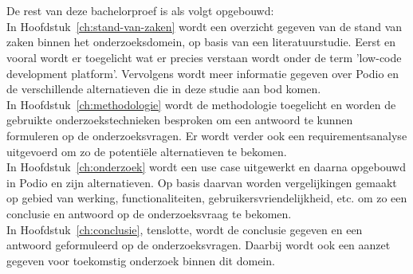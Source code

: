 \section{}%
\label{sec:opzet-bachelorproef} %


De rest van deze bachelorproef is als volgt opgebouwd: \\

In Hoofdstuk~\ref{ch:stand-van-zaken} wordt een overzicht gegeven van de stand van zaken binnen het onderzoeksdomein, op basis van een literatuurstudie. Eerst en vooral wordt er toegelicht wat er precies verstaan wordt onder de term 'low-code development platform'. Vervolgens wordt meer informatie gegeven over Podio en de verschillende alternatieven die in deze studie aan bod komen. \\

In Hoofdstuk~\ref{ch:methodologie} wordt de methodologie toegelicht en worden de gebruikte onderzoekstechnieken besproken om een antwoord te kunnen formuleren op de onderzoeksvragen. Er wordt verder ook een requirementsanalyse uitgevoerd om zo de potentiële alternatieven te bekomen. \\

In Hoofdstuk~\ref{ch:onderzoek} wordt een use case uitgewerkt en daarna opgebouwd in Podio en zijn alternatieven. Op basis daarvan worden vergelijkingen gemaakt op gebied van werking, functionaliteiten, gebruikersvriendelijkheid, etc. om zo een conclusie en antwoord op de onderzoeksvraag te bekomen. \\

In Hoofdstuk~\ref{ch:conclusie}, tenslotte, wordt de conclusie gegeven en een antwoord geformuleerd op de onderzoeksvragen. Daarbij wordt ook een aanzet gegeven voor toekomstig onderzoek binnen dit domein. \\